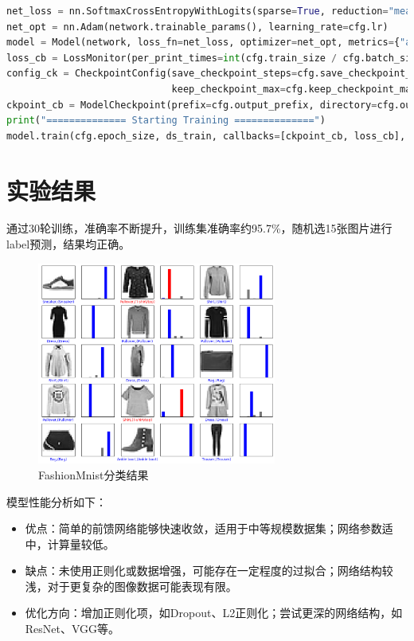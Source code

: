 \documentclass[12pt]{ctexart}
\begin{document}
\begin{lstlisting}[language=Python,caption={分类网络训练}]
net_loss = nn.SoftmaxCrossEntropyWithLogits(sparse=True, reduction="mean")
net_opt = nn.Adam(network.trainable_params(), learning_rate=cfg.lr)
model = Model(network, loss_fn=net_loss, optimizer=net_opt, metrics={"acc"})
loss_cb = LossMonitor(per_print_times=int(cfg.train_size / cfg.batch_size))
config_ck = CheckpointConfig(save_checkpoint_steps=cfg.save_checkpoint_steps,
                             keep_checkpoint_max=cfg.keep_checkpoint_max)
ckpoint_cb = ModelCheckpoint(prefix=cfg.output_prefix, directory=cfg.output_directory, config=config_ck)
print("============== Starting Training ==============")
model.train(cfg.epoch_size, ds_train, callbacks=[ckpoint_cb, loss_cb], dataset_sink_mode=False)
\end{lstlisting}

\section*{实验结果}

通过30轮训练，准确率不断提升，训练集准确率约95.7\%，随机选15张图片进行label预测，结果均正确。

\begin{figure}[H]
    \centering
    \includegraphics[width=0.7\textwidth]{image/2.png}
    \caption{FashionMnist分类结果}
\end{figure}

模型性能分析如下：
\begin{itemize}
    \item 优点：简单的前馈网络能够快速收敛，适用于中等规模数据集；网络参数适中，计算量较低。
    \item 缺点：未使用正则化或数据增强，可能存在一定程度的过拟合；网络结构较浅，对于更复杂的图像数据可能表现有限。
    \item 优化方向：增加正则化项，如Dropout、L2正则化；尝试更深的网络结构，如ResNet、VGG等。
\end{itemize}
\end{document}
